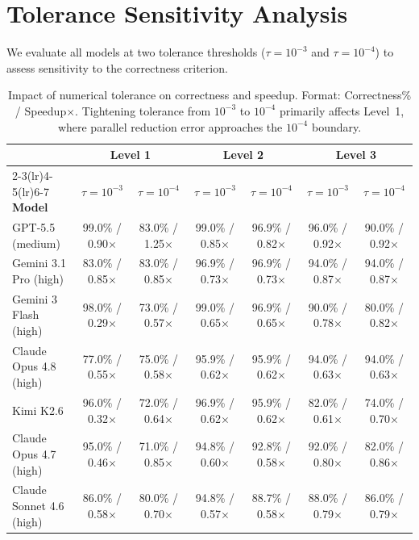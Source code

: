 \documentclass[]{fairmeta}
\begin{document}
\section{Tolerance Sensitivity Analysis}
\label{app:tolerance}

We evaluate all models at two tolerance thresholds ($\tau = 10^{-3}$ and $\tau = 10^{-4}$) to assess sensitivity to the correctness criterion.

\begin{table}[H]
\centering
\caption{Impact of numerical tolerance on correctness and speedup. Format: Correctness\% / Speedup$\times$. Tightening tolerance from $10^{-3}$ to $10^{-4}$ primarily affects Level~1, where parallel reduction error approaches the $10^{-4}$ boundary.}
\scriptsize
\begin{tabular}{l cc cc cc}
\toprule
& \multicolumn{2}{c}{\textbf{Level 1}} & \multicolumn{2}{c}{\textbf{Level 2}} & \multicolumn{2}{c}{\textbf{Level 3}} \\
\cmidrule(lr){2-3}\cmidrule(lr){4-5}\cmidrule(lr){6-7}
\textbf{Model} & $\tau\!=\!10^{-3}$ & $\tau\!=\!10^{-4}$ & $\tau\!=\!10^{-3}$ & $\tau\!=\!10^{-4}$ & $\tau\!=\!10^{-3}$ & $\tau\!=\!10^{-4}$ \\
\midrule
GPT-5.5 (medium)         & 99.0\% / 0.90$\times$ & 83.0\% / 1.25$\times$ & 99.0\% / 0.85$\times$ & 96.9\% / 0.82$\times$ & 96.0\% / 0.92$\times$ & 90.0\% / 0.92$\times$ \\
Gemini 3.1 Pro (high)    & 83.0\% / 0.85$\times$ & 83.0\% / 0.85$\times$ & 96.9\% / 0.73$\times$ & 96.9\% / 0.73$\times$ & 94.0\% / 0.87$\times$ & 94.0\% / 0.87$\times$ \\
Gemini 3 Flash (high)    & 98.0\% / 0.29$\times$ & 73.0\% / 0.57$\times$ & 99.0\% / 0.65$\times$ & 96.9\% / 0.65$\times$ & 90.0\% / 0.78$\times$ & 80.0\% / 0.82$\times$ \\
Claude Opus 4.8 (high)   & 77.0\% / 0.55$\times$ & 75.0\% / 0.58$\times$ & 95.9\% / 0.62$\times$ & 95.9\% / 0.62$\times$ & 94.0\% / 0.63$\times$ & 94.0\% / 0.63$\times$ \\
Kimi K2.6                & 96.0\% / 0.32$\times$ & 72.0\% / 0.64$\times$ & 96.9\% / 0.62$\times$ & 95.9\% / 0.62$\times$ & 82.0\% / 0.61$\times$ & 74.0\% / 0.70$\times$ \\
Claude Opus 4.7 (high)   & 95.0\% / 0.46$\times$ & 71.0\% / 0.85$\times$ & 94.8\% / 0.60$\times$ & 92.8\% / 0.58$\times$ & 92.0\% / 0.80$\times$ & 82.0\% / 0.86$\times$ \\
Claude Sonnet 4.6 (high) & 86.0\% / 0.58$\times$ & 80.0\% / 0.70$\times$ & 94.8\% / 0.57$\times$ & 88.7\% / 0.58$\times$ & 88.0\% / 0.79$\times$ & 86.0\% / 0.79$\times$ \\
\bottomrule
\end{tabular}
\end{table}
\end{document}
